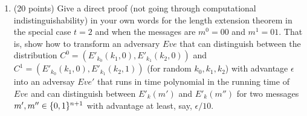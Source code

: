 \documentclass{article}
\begin{document}
\begin{enumerate}[,start=6]
\item{}
(20 points) Give a direct proof (not going through computational indistinguishability) in your own words for the length extension theorem in the special case $t=2$ and when
the messages are $m^0 = 00$ and $m^1 = 01$. That is, show how to transform an adversary $Eve$ that
can distinguish between the distribution $C^0 = (E'_{k_0}(k_1,0),E'_{k_1}(k_2,0))$ and $C^1 = (E'_{k_0}(k_1,0),E'_{k_1}(k_2,1))$
(for random $k_0,k_1,k_2$) with advantage $\epsilon$ into an adversay $Eve'$ that runs in time polynomial in the running time of $Eve$
and can distinguish between $E'_k(m')$ and $E'_k(m'')$ for two messages $m',m''\in\{0,1\}^{n+1}$ with advantage at least, say, $\epsilon/10$.%


\end{enumerate}
\end{document}
